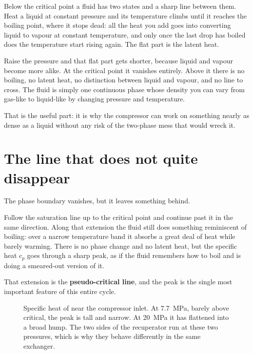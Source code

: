 \documentclass[11pt,a4paper]{report}
\begin{document}
Below the critical point a fluid has two states and a sharp line between
them. Heat a liquid at constant pressure and its temperature climbs until it
reaches the boiling point, where it stops dead: all the heat you add goes
into converting liquid to vapour at constant temperature, and only once the
last drop has boiled does the temperature start rising again. The flat part
is the latent heat.

Raise the pressure and that flat part gets shorter, because liquid and
vapour become more alike. At the critical point it vanishes entirely. Above
it there is no boiling, no latent heat, no distinction between liquid and
vapour, and no line to cross. The fluid is simply one continuous phase whose
density you can vary from gas-like to liquid-like by changing pressure and
temperature.

That is the useful part: it is why the compressor can work on something
nearly as dense as a liquid without any risk of the two-phase mess that
would wreck it.

\section{The line that does not quite disappear}

The phase boundary vanishes, but it leaves something behind.

Follow the saturation line up to the critical point and continue past it in
the same direction. Along that extension the fluid still does something
reminiscent of boiling: over a narrow temperature band it absorbs a great
deal of heat while barely warming. There is no phase change and no latent
heat, but the specific heat $c_p$ goes through a sharp peak, as if the
fluid remembers how to boil and is doing a smeared-out version of it.

That extension is the \textbf{pseudo-critical line}, and the peak is the
single most important feature of this entire cycle.

\begin{figure}[htbp]
\centering
{}
\caption{Specific heat of  near the compressor inlet. At
\SI{7.7}{\mega\pascal}, barely above critical, the peak is tall and narrow.
At \SI{20}{\mega\pascal} it has flattened into a broad hump. The two sides
of the recuperator run at these two pressures, which is why they behave
differently in the same exchanger.}
\label{fig:cp}
\end{figure}
\end{document}
